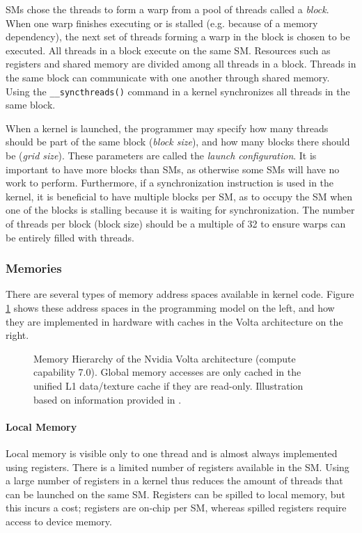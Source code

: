 SMs chose the threads to form a warp from a pool of threads called a \emph{block}. When one warp finishes executing or is stalled (e.g. because of a memory dependency), the next set of threads forming a warp in the block is chosen to be executed. All threads in a block execute on the same SM. Resources such as registers and shared memory are divided among all threads in a block. Threads in the same block can communicate with one another through shared memory. Using the \texttt{\_\_syncthreads()} command in a kernel synchronizes all threads in the same block.

When a kernel is launched, the programmer may specify how many threads should be part of the same block (\emph{block size}), and how many blocks there should be (\emph{grid size}). These parameters are called the \emph{launch configuration}. It is important to have more blocks than SMs, as otherwise some SMs will have no work to perform. Furthermore, if a synchronization instruction is used in the kernel, it is beneficial to have multiple blocks per SM, as to occupy the SM when one of the blocks is stalling because it is waiting for synchronization. The number of threads per block (block size) should be a multiple of 32 to ensure warps can be entirely filled with threads. \cite[Section~10]{cuda-best-practices}

\subsubsection{Memories} \label{sec:memories}

There are several types of memory address spaces available in kernel code. Figure \ref{fig:memory-hierarchy} shows these address spaces in the programming model on the left, and how they are implemented in hardware with caches in the Volta architecture on the right. 

\begin{figure}
	\makebox[\textwidth]{
	}
	\caption{\label{fig:memory-hierarchy} Memory Hierarchy of the Nvidia Volta architecture (compute capability 7.0). Global memory accesses are only cached in the unified L1 data/texture cache if they are read-only. Illustration based on information provided in \cite[Sections 2.3, 5.3.2, H.6]{cuda-programming}.}
\end{figure}

\paragraph{Local Memory}
Local memory is visible only to one thread and is almost always implemented using registers. There is a limited number of registers available in the SM. Using a large number of registers in a kernel thus reduces the amount of threads that can be launched on the same SM. Registers can be spilled to local memory, but this incurs a cost; registers are on-chip per SM, whereas spilled registers require access to device memory.

